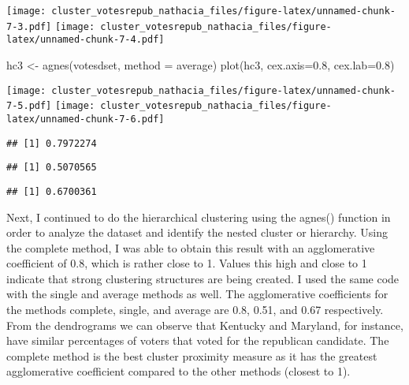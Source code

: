 \documentclass[
]{article}
\newenvironment{Shaded}{\begin{snugshade}}{\end{snugshade}}
\newcommand{\AttributeTok}[1]{\textcolor[rgb]{0.77,0.63,0.00}{#1}}
\newcommand{\FloatTok}[1]{\textcolor[rgb]{0.00,0.00,0.81}{#1}}
\newcommand{\FunctionTok}[1]{\textcolor[rgb]{0.00,0.00,0.00}{#1}}
\newcommand{\NormalTok}[1]{#1}
\newcommand{\OtherTok}[1]{\textcolor[rgb]{0.56,0.35,0.01}{#1}}
\newcommand{\SpecialCharTok}[1]{\textcolor[rgb]{0.00,0.00,0.00}{#1}}
\newcommand{\StringTok}[1]{\textcolor[rgb]{0.31,0.60,0.02}{#1}}
\begin{document}
\texttt{[image: cluster\_votesrepub\_nathacia\_files/figure-latex/unnamed-chunk-7-3.pdf]}
\texttt{[image: cluster\_votesrepub\_nathacia\_files/figure-latex/unnamed-chunk-7-4.pdf]}

\begin{Shaded}
\begin{Highlighting}[]
\NormalTok{hc3 }\OtherTok{\textless{}{-}} \FunctionTok{agnes}\NormalTok{(votesdset, }\AttributeTok{method =} \StringTok{\textquotesingle{}average\textquotesingle{}}\NormalTok{)}
\FunctionTok{plot}\NormalTok{(hc3, }\AttributeTok{cex.axis=}\FloatTok{0.8}\NormalTok{, }\AttributeTok{cex.lab=}\FloatTok{0.8}\NormalTok{)}
\end{Highlighting}
\end{Shaded}

\texttt{[image: cluster\_votesrepub\_nathacia\_files/figure-latex/unnamed-chunk-7-5.pdf]}
\texttt{[image: cluster\_votesrepub\_nathacia\_files/figure-latex/unnamed-chunk-7-6.pdf]}

\begin{Shaded}
\end{Shaded}

\begin{verbatim}
## [1] 0.7972274
\end{verbatim}

\begin{Shaded}
\end{Shaded}

\begin{verbatim}
## [1] 0.5070565
\end{verbatim}

\begin{Shaded}
\end{Shaded}

\begin{verbatim}
## [1] 0.6700361
\end{verbatim}

Next, I continued to do the hierarchical clustering using the agnes()
function in order to analyze the dataset and identify the nested cluster
or hierarchy. Using the complete method, I was able to obtain this
result with an agglomerative coefficient of 0.8, which is rather close
to 1. Values this high and close to 1 indicate that strong clustering
structures are being created. I used the same code with the single and
average methods as well. The agglomerative coefficients for the methods
complete, single, and average are 0.8, 0.51, and 0.67 respectively. From
the dendrograms we can observe that Kentucky and Maryland, for instance,
have similar percentages of voters that voted for the republican
candidate. The complete method is the best cluster proximity measure as
it has the greatest agglomerative coefficient compared to the other
methods (closest to 1).
\end{document}
